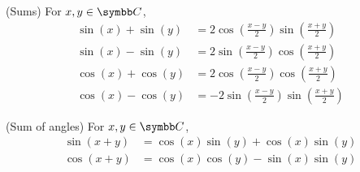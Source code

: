 \begin{proposition}
\begin{propenum}
     (Sums) For \( x, y \in \BC \),
    \begin{align}
      \sin(x) + \sin(y) &= 2 \cos\left(\frac{x - y} 2 \right) \sin\left(\frac{x + y} 2 \right) \label{thm:trigonometric_identities/sums/sin_sum} \\
      \sin(x) - \sin(y) &= 2 \sin\left(\frac{x - y} 2 \right) \cos\left(\frac{x + y} 2 \right) \label{thm:trigonometric_identities/sums/sin_diff} \\
      \cos(x) + \cos(y) &= 2 \cos\left(\frac{x - y} 2 \right) \cos\left(\frac{x + y} 2 \right) \label{thm:trigonometric_identities/sums/cos_sum} \\
      \cos(x) - \cos(y) &= -2 \sin\left(\frac{x - y} 2 \right) \sin\left(\frac{x + y} 2 \right) \label{thm:trigonometric_identities/sums/cos_diff}
    \end{align}

     (Sum of angles) For \( x, y \in \BC \),
    \begin{align}
      \sin(x + y) &= \cos(x) \sin(y) + \cos(x) \sin(y) \label{thm:trigonometric_identities/products/sin} \\
      \cos(x + y) &= \cos(x) \cos(y) - \sin(x) \sin(y) \label{thm:trigonometric_identities/products/cos}
    \end{align}
  \end{propenum}
\end{proposition}
